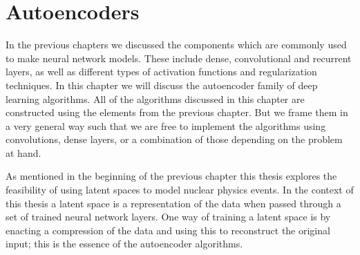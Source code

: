
\chapter{Autoencoders}\label{sec:autoencoder}

In the previous chapters we discussed the components which are commonly used to make neural network models. These include dense, convolutional and recurrent layers, as well as different types of activation functions and regularization techniques. In this chapter we will discuss the autoencoder family of deep learning algorithms. All of the algorithms discussed in this chapter are constructed using the elements from the previous chapter. But we frame them in a very general way such that we are free to implement the algorithms using convolutions, dense layers, or a combination of those depending on the problem at hand.

As mentioned in the beginning of the previous chapter this thesis explores the feasibility of using latent spaces to model nuclear physics events. In the context of this thesis a latent space is a representation of the data when passed through a set of trained neural network layers. One way of training a latent space is by enacting a compression of the data and using this to reconstruct the original input; this is the essence of the autoencoder algorithms.